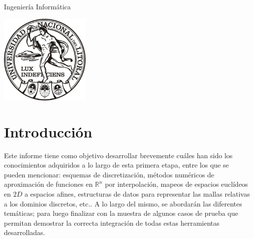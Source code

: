 \begin{titlepage}


  {\large
    Ingeniería Informática}\\[1cm] %
  
  \begin{center}
    \includegraphics[width=0.33\textwidth]{logo_unl.eps}\\[1cm] %
  \end{center}

  \vfill %
\end{titlepage}



\section{Introducción}

Este informe tiene como objetivo desarrollar brevemente cuáles han
sido los conocimientos adquiridos a lo largo de esta primera etapa, entre los que se pueden mencionar: esquemas de discretización, métodos
numéricos de aproximación de funciones en $\mathbb{R}^n$ por interpolación, mapeos de espacios euclídeos en $2D$ a espacios afines, estructuras de datos para representar las mallas relativas a los dominios discretos, etc.. A lo largo del mismo, se abordarán las diferentes temáticas; para luego finalizar con la muestra de algunos casos de prueba que permitan demostrar la correcta integración de todas estas herramientas desarrolladas.



